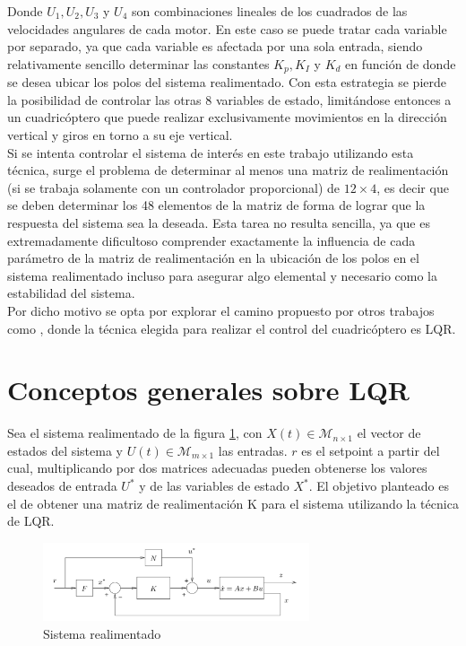 \documentclass[main]{subfiles}
\begin{document}
Donde $U_1, U_2, U_3$ y $U_4$ son combinaciones lineales de los cuadrados de las velocidades angulares de cada motor. En este caso se puede tratar cada variable por separado, ya que cada variable es afectada por una sola entrada, siendo relativamente sencillo determinar las constantes $K_p, K_I$ y $K_d$ en funci\'on de donde se desea ubicar los polos del sistema realimentado. Con esta estrategia se pierde la posibilidad de controlar las otras 8 variables de estado, limit\'andose entonces a un cuadric\'optero que puede realizar exclusivamente movimientos en la direcci\'on vertical y giros en torno a su eje vertical.\\

Si se intenta controlar el sistema de inter\'es en este trabajo utilizando esta t\'ecnica, surge el problema de determinar al menos una matriz de realimentaci\'on (si se trabaja solamente con un controlador proporcional) de $12\times4$, es decir que se deben determinar los 48 elementos de la matriz de forma de lograr que la respuesta del sistema sea la deseada. Esta tarea no resulta sencilla, ya que es extremadamente dificultoso comprender exactamente la influencia de cada par\'ametro de la matriz de realimentaci\'on en la ubicaci\'on de los polos en el sistema realimentado incluso para asegurar algo elemental y necesario como la estabilidad del sistema.\\

Por dicho motivo se opta por explorar el camino propuesto por otros trabajos como \cite{bib:lqr-discreto}, donde la t\'ecnica elegida para realizar el control del cuadric\'optero es LQR.


\section{Conceptos generales sobre LQR}

Sea el sistema realimentado de la figura \ref{fig:bloque}, con $X(t)\in \mathcal{M}_{n\times1}$ el vector de estados del sistema y $U(t)\in \mathcal{M}_{m\times1}$ las entradas. $r$ es el setpoint a partir del cual, multiplicando por dos matrices adecuadas pueden obtenerse los valores deseados de entrada $U^*$ y de las variables de estado $X^*$. El objetivo planteado es el de obtener una matriz de realimentaci\'on K para el sistema utilizando la t\'ecnica de LQR. 

\begin{figure}[h!]
	\centering
	\includegraphics[width=0.7\textwidth]{./pics_control/bloque.pdf}
	\caption{Sistema realimentado}
	\label{fig:bloque}
\end{figure}
 
\end{document}
